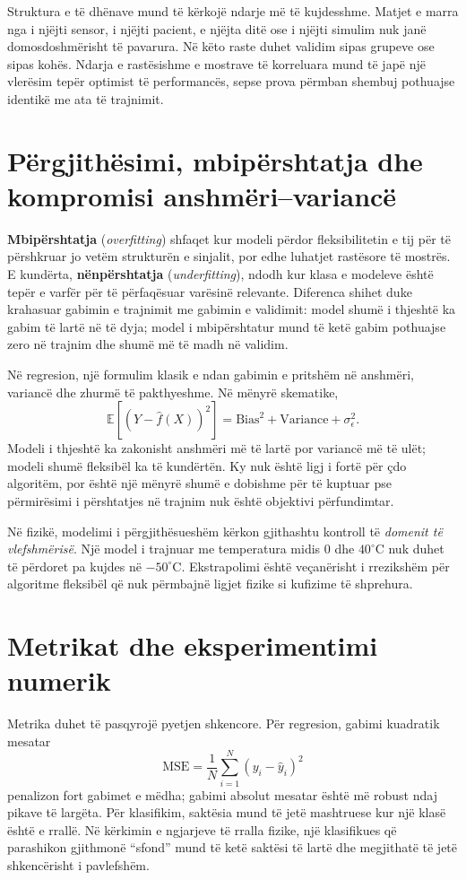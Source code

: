 \documentclass[12pt,a4paper,oneside]{book}
\newcommand{\term}[2]{\textbf{#1} (\textit{#2})}
\newcommand{\E}{\mathbb{E}}
\begin{document}
Struktura e të dhënave mund të kërkojë ndarje më të kujdesshme. Matjet e marra nga i njëjti sensor, i njëjti pacient, e njëjta ditë ose i njëjti simulim nuk janë domosdoshmërisht të pavarura. Në këto raste duhet validim sipas grupeve ose sipas kohës. Ndarja e rastësishme e mostrave të korreluara mund të japë një vlerësim tepër optimist të performancës, sepse prova përmban shembuj pothuajse identikë me ata të trajnimit.

\section{Përgjithësimi, mbipërshtatja dhe kompromisi anshmëri--variancë}

\term{Mbipërshtatja}{overfitting} shfaqet kur modeli përdor fleksibilitetin e tij për të përshkruar jo vetëm strukturën e sinjalit, por edhe luhatjet rastësore të mostrës. E kundërta, \term{nënpërshtatja}{underfitting}, ndodh kur klasa e modeleve është tepër e varfër për të përfaqësuar varësinë relevante. Diferenca shihet duke krahasuar gabimin e trajnimit me gabimin e validimit: model shumë i thjeshtë ka gabim të lartë në të dyja; model i mbipërshtatur mund të ketë gabim pothuajse zero në trajnim dhe shumë më të madh në validim.

Në regresion, një formulim klasik e ndan gabimin e pritshëm në anshmëri, variancë dhe zhurmë të pakthyeshme. Në mënyrë skematike,
\[
\E[(Y-\hat f(X))^2]=\text{Bias}^2+\text{Variance}+\sigma_\epsilon^2.
\]
Modeli i thjeshtë ka zakonisht anshmëri më të lartë por variancë më të ulët; modeli shumë fleksibël ka të kundërtën. Ky nuk është ligj i fortë për çdo algoritëm, por është një mënyrë shumë e dobishme për të kuptuar pse përmirësimi i përshtatjes në trajnim nuk është objektivi përfundimtar.

Në fizikë, modelimi i përgjithësueshëm kërkon gjithashtu kontroll të \emph{domenit të vlefshmërisë}. Një model i trajnuar me temperatura midis $0$ dhe $40^\circ$C nuk duhet të përdoret pa kujdes në $-50^\circ$C. Ekstrapolimi është veçanërisht i rrezikshëm për algoritme fleksibël që nuk përmbajnë ligjet fizike si kufizime të shprehura.

\section{Metrikat dhe eksperimentimi numerik}

Metrika duhet të pasqyrojë pyetjen shkencore. Për regresion, gabimi kuadratik mesatar
\[
\mathrm{MSE}=\frac1N\sum_{i=1}^{N}(y_i-\hat y_i)^2
\]
penalizon fort gabimet e mëdha; gabimi absolut mesatar është më robust ndaj pikave të largëta. Për klasifikim, saktësia mund të jetë mashtruese kur një klasë është e rrallë. Në kërkimin e ngjarjeve të rralla fizike, një klasifikues që parashikon gjithmonë ``sfond'' mund të ketë saktësi të lartë dhe megjithatë të jetë shkencërisht i pavlefshëm.
\end{document}
